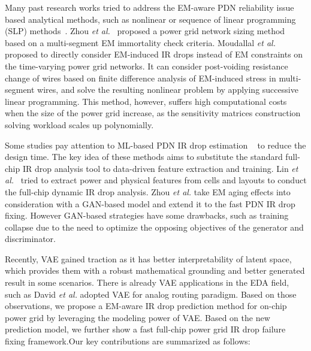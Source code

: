 Many past research works tried to address the EM-aware PDN reliability issue based analytical methods, such as nonlinear or sequence of linear programming (SLP) methods~\cite{ChBr:TCAD'88,DuMa:DAC'89,Tan:DAC'99,Wang:TCAD'05,ZhouSun:TVLSI'19, Sukharev:2019pg, ZhouYu:ASPDAC'20,ZhouJin:ICCAD'20}. Zhou {\it et al.}~\cite{ZhouSun:TVLSI'19,ZhouChen:Integration'21} proposed a power grid network sizing method based on a multi-segment EM immortality check criteria. Moudallal {\it et al.}~\cite{Sukharev:2019pg} proposed to directly consider EM-induced IR drops instead of EM constraints on the time-varying power grid networks. It can consider post-voiding resistance change of wires based on finite difference analysis of EM-induced stress in multi-segment wires, and solve the resulting nonlinear problem by applying successive linear programming. This method, however, suffers high computational costs when the size of the power grid increase, as the sensitivity matrices construction solving workload scales up polynomially.
   

Some studies pay attention to ML-based PDN IR drop estimation ~\cite{LinFang:2018vts,Fang:2018dynireco,HoKahng:ICCAD'19,Xie:2020powernet,Sachin:ASPDAC'21} to reduce the design time. 
The key idea of these methods aims to substitute the standard full-chip IR drop analysis tool to data-driven feature extraction and training. Lin {\it et al.}~\cite{LinFang:2018vts} tried to extract power and physical features from cells and layouts to conduct the full-chip dynamic IR drop analysis. Zhou {\it et al.} \cite{ZhouJin:ICCAD'20} take EM aging effects into consideration with a GAN-based model and extend it to the fast PDN IR drop fixing. However GAN-based strategies have some drawbacks, such as training collapse due to the need to optimize the opposing objectives of the generator and discriminator. 


Recently,  VAE  \cite{Diederik:arxiv'22} gained traction as it has better interpretability of latent space, which provides them with a robust mathematical grounding and better generated result in some scenarios. There is already VAE applications in the EDA field, such as David {\it et al.} \cite{ZhuICCAD19:GeniusRoute} adopted VAE for analog routing paradigm.
Based on those observations, we propose a EM-aware IR drop prediction method for on-chip power grid by leveraging the modeling power of VAE. Based on the new prediction model, we further show a fast full-chip power grid IR drop failure fixing framework.Our key contributions are summarized as follows:

